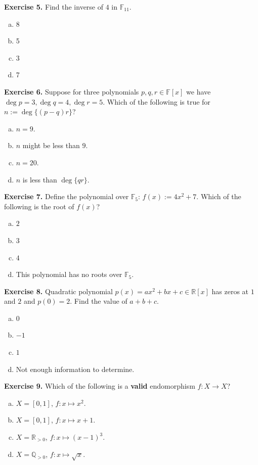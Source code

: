 \documentclass[../lecture-notes.tex]{subfiles}
\begin{document}
\textbf{Exercise 5.} Find the inverse of $4$ in $\mathbb{F}_{11}$.
\begin{enumerate}[a)]
    \item 8
    \item 5
    \item 3
    \item 7
\end{enumerate}

\textbf{Exercise 6.} Suppose for three polynomials $p,q,r \in \mathbb{F}[x]$ we have $\deg p = 3, \deg q = 4, \deg r = 5$. Which of the following is true for $n := \deg \{(p-q)r\}$?
\begin{enumerate}[a)]
    \item $n = 9$.
    \item $n$ might be less than $9$.
    \item $n = 20$.
    \item $n$ is less than $\deg \{qr\}$. 
\end{enumerate}

\textbf{Exercise 7.} Define the polynomial over $\mathbb{F}_5$: $f(x) := 4x^2 + 7$. Which of the following is the root of $f(x)$?
\begin{enumerate}[a)]
    \item $2$
    \item $3$
    \item $4$
    \item This polynomial has no roots over $\mathbb{F}_5$.
\end{enumerate}

\textbf{Exercise 8.} Quadratic polynomial $p(x) = ax^2+bx+c \in \mathbb{R}[x]$ has zeros at $1$ and $2$ and $p(0) = 2$. Find the value of $a+b+c$.
\begin{enumerate}[a)]
    \item $0$
    \item $-1$
    \item $1$
    \item Not enough information to determine.
\end{enumerate}

\textbf{Exercise 9.} Which of the following is a \textbf{valid} endomorphism $f: X \to X$? 
\begin{enumerate}[a)]
    \item $X = [0,1]$, $f: x \mapsto x^2$.
    \item $X = [0,1]$, $f: x \mapsto x + 1$.
    \item $X = \mathbb{R}_{>0}$, $f: x \mapsto (x-1)^3$.
    \item $X = \mathbb{Q}_{>0}$, $f: x \mapsto \sqrt{x}$.
\end{enumerate}
\end{document}
